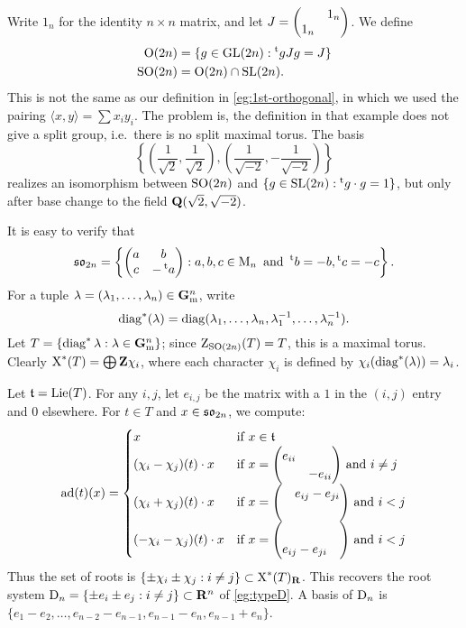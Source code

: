 \begin{example}[Orthogonal]\label{eg:orthogonal-Dn}
Write $1_n$ for the identity $n\times n$ matrix, and let 
$J=\begin{pmatrix}  & 1_n \\ 1_n &  \end{pmatrix}$. We define 
\begin{align*}
  \operatorname{O}(2n) &= \{g\in \operatorname{GL}(2n):\prescript{\mathrm{t}}{}{g} J g=J\} \\
  \operatorname{SO}(2n) &= \operatorname{O}(2n)\cap \operatorname{SL}(2n) .
\end{align*}
This is not the same as our definition in \autoref{eg:1st-orthogonal}, in which 
we used the pairing $\langle x,y\rangle = \sum x_i y_i$. The problem is, the 
definition in that example does not give a split group, 
i.e.~there is no split maximal torus. The basis  
\[
  \left\{\left(\frac{1}{\sqrt{2}},\frac{1}{\sqrt{2}}\right),\left(\frac{1}{\sqrt{-2}},-\frac{1}{\sqrt{-2}}\right)\right\}
\]
realizes an isomorphism between $\operatorname{SO}(2n)$ and 
$\{g\in \operatorname{SL}(2n):\prescript{\mathrm{t}}{}{g}\cdot g=1\}$, but only after base change to the 
field $\mathbf{Q}(\sqrt{2},\sqrt{-2})$. 

It is easy to verify that 
\[
  \mathfrak{so}_{2n} = \left\{\begin{pmatrix} a & b \\ c & -\prescript{\mathrm{t}}{}{a} \end{pmatrix}:a,b,c\in \operatorname{M}_n\text{ and }\prescript{\mathrm{t}}{}{b}=-b,\prescript{\mathrm{t}}{}{c}=-c\right\} .
\]
For a tuple $\lambda=(\lambda_1,\dots,\lambda_n)\in \mathbf{G}_\mathrm{m}^n$, write 
\[
  \operatorname{diag}^\ast(\lambda)=\operatorname{diag}(\lambda_1,\dots,\lambda_n,\lambda_1^{-1},\dots,\lambda_n^{-1}) .
\]
Let $T=\{\operatorname{diag}^\ast\lambda:\lambda\in \mathbf{G}_\mathrm{m}^n\}$; since 
$\operatorname{Z}_{\operatorname{SO}(2n)}(T)=T$, this is a maximal torus. Clearly 
$\operatorname{X}^\ast(T)=\bigoplus \mathbf{Z} \chi_i$, where each character $\chi_i$ is 
defined by $\chi_i(\operatorname{diag}^\ast(\lambda)) = \lambda_i$. 

Let $\mathfrak{t}=\operatorname{Lie}(T)$. For any $i,j$, let $e_{i,j}$ be the matrix with a $1$ in the 
$(i,j)$ entry and $0$ elsewhere. For $t\in T$ and $x\in \mathfrak{so}_{2n}$, we compute: 
\[
  \operatorname{ad}(t)(x) = 
  \begin{cases}
    x & \text{if $x\in \mathfrak{t}$} \\ 
    (\chi_i-\chi_j)(t)\cdot x & \text{if $x = \begin{pmatrix} e_{ii} &  \\  & -e_{i i} \end{pmatrix}$ and $i\ne j$} \\
    (\chi_i+\chi_j)(t)\cdot x & \text{if $x=\begin{pmatrix}  & e_{ij}-e_{ji} \\  &  \end{pmatrix}$ and $i<j$} \\
    (-\chi_i-\chi_j)(t)\cdot x & \text{if $x=\begin{pmatrix}  &  \\ e_{i j}-e_{j i} &  \end{pmatrix}$ and $i<j$}
  \end{cases}
\]
Thus the set of roots is 
$\{\pm \chi_i\pm \chi_j:i\ne j\}\subset \operatorname{X}^\ast(T)_{\mathbf{R}}$. This recovers 
the root system $\mathrm{D}_n = \{\pm e_i\pm e_j:i\ne j\}\subset \mathbf{R}^n$ of 
\autoref{eg:typeD}. A basis of $\mathrm{D}_n$ is
$\{e_1-e_2,\dots,e_{n-2}-e_{n-1},e_{n-1}-e_n,e_{n-1}+e_n\}$. 
\end{example}


